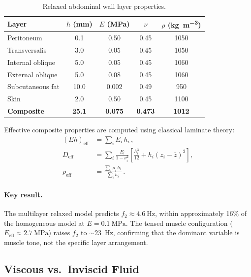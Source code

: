 \documentclass[12pt]{article}
\begin{document}
\begin{table}[htbp]
\centering
\caption{Relaxed abdominal wall layer properties.}
\label{tab:layers}
\begin{tabular}{@{}lSSSS@{}}
\toprule
{Layer} & {$h$ (\si{\milli\metre})} & {$E$ (\si{\mega\pascal})} & {$\nu$} &
  {$\rho$ (\si{\kilo\gram\per\metre\cubed})} \\
\midrule
Peritoneum         & 0.1  & 0.50   & 0.45 & 1050 \\
Transversalis      & 3.0  & 0.05   & 0.45 & 1050 \\
Internal oblique   & 5.0  & 0.05   & 0.45 & 1060 \\
External oblique   & 5.0  & 0.08   & 0.45 & 1060 \\
Subcutaneous fat   & 10.0 & 0.002  & 0.49 & 950  \\
Skin               & 2.0  & 0.50   & 0.45 & 1100 \\
\midrule
\textbf{Composite} & \textbf{25.1} & \textbf{0.075} & \textbf{0.473} & \textbf{1012} \\
\bottomrule
\end{tabular}
\end{table}

Effective composite properties are computed using classical laminate theory:
\begin{align}
  (Eh)_{\mathrm{eff}} &= \sum_{i} E_{i}\,h_{i} \,,
    \tag{S18} \\
  D_{\mathrm{eff}} &= \sum_{i} \frac{E_{i}}{1-\nu_{i}^{2}}
    \left[\frac{h_{i}^{3}}{12} + h_{i}(z_{i}-\bar{z})^{2}\right] ,
    \tag{S19} \\
  \rho_{\mathrm{eff}} &= \frac{\sum_{i}\rho_{i}\,h_{i}}{\sum_{i}h_{i}} \,.
    \tag{S20}
\end{align}

\paragraph{Key result.}
The multilayer relaxed model predicts $f_{2} \approx \SI{4.6}{\hertz}$,
within approximately 16\% of the homogeneous model at
$E = \SI{0.1}{\mega\pascal}$.
The tensed muscle configuration ($E_{\mathrm{eff}} \approx \SI{2.7}{\mega\pascal}$)
raises $f_{2}$ to $\sim$\SI{23}{\hertz}, confirming that the dominant
variable is muscle tone, not the specific layer arrangement.


\subsection{Viscous vs.\ Inviscid Fluid}
\label{sec:viscous}
\end{document}
